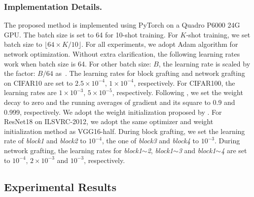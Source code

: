\documentclass[letterpaper]{article} %
\begin{document}
{{        \subsubsection{Implementation Details.}
        {
            The proposed method is implemented using PyTorch on a Quadro P6000 24G GPU.
            The batch size is set to 64 for 10-shot training. 
            For $K$-shot training, we set batch size to $\lfloor 64\times K/10 \rfloor$.
            For all experiments, we adopt Adam algorithm for network optimization. 
            Without extra clarification, the following learning rates work when batch size is 64. 
            For other batch size: $B$, the learning rate is scaled by the factor: $B/64$ as~\cite{he2016deep}.
            The learning rates for block grafting and network grafting on CIFAR10 are set to $2.5 \times 10^{-4}$, $1 \times 10^{-4}$, respectively. 
            For CIFAR100, the learning rates are $1 \times 10^{-3}$, $5 \times 10^{-5}$, respectively. 
            Following \cite{kingma2014adam}, we set the weight decay to zero and the running averages of gradient and its square to 0.9 and 0.999, respectively.
            We adopt the weight initialization proposed by \cite{he2015delving}.
            For ResNet18 on ILSVRC-2012, we adopt the same optimizer and weight initialization method as VGG16-half.
            During block grafting, we set the learning rate of \emph{block1} and \emph{block2} to $10^{-4}$, the one of \emph{block3} and \emph{block4} to $10^{-3}$.
            During network grafting, the learning rates for \emph{block1$\sim$2}, \emph{block1$\sim$3} and \emph{block1$\sim$4} are set to $10^{-4}$, $2 \times 10^{-3}$ and $10^{-3}$, respectively.
        }


    }

    \subsection{Experimental Results}
    {
        {
}}}
\end{document}
